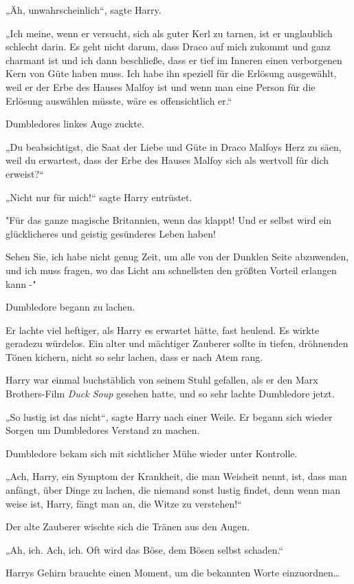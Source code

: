 {„Äh, unwahrscheinlich“, sagte Harry.

„Ich meine, wenn er versucht, sich als guter Kerl zu tarnen, ist er unglaublich schlecht darin. Es geht nicht darum, dass Draco auf mich zukommt und ganz charmant ist und ich dann beschließe, dass er tief im Inneren einen verborgenen Kern von Güte haben muss. Ich habe ihn speziell für die Erlösung ausgewählt, weil er der Erbe des Hauses Malfoy ist und wenn man eine Person für die Erlösung auswählen müsste, wäre es offensichtlich er.“

Dumbledores linkes Auge zuckte.

„Du beabsichtigst, die Saat der Liebe und Güte in Draco Malfoys Herz zu säen, weil du erwartest, dass der Erbe des Hauses Malfoy sich als wertvoll für dich erweist?“

„Nicht nur für mich!“ sagte Harry entrüstet.

"Für das ganze magische Britannien, wenn das klappt! Und er selbst wird ein glücklicheres und geistig gesünderes Leben haben!

Sehen Sie, ich habe nicht genug Zeit, um alle von der Dunklen Seite abzuwenden, und ich muss fragen, wo das Licht am schnellsten den größten Vorteil erlangen kann -"

Dumbledore begann zu lachen.

Er lachte viel heftiger, als Harry es erwartet hätte, fast heulend. Es wirkte geradezu würdelos. Ein alter und mächtiger Zauberer sollte in tiefen, dröhnenden Tönen kichern, nicht so sehr lachen, dass er nach Atem rang.

Harry war einmal buchstäblich von seinem Stuhl gefallen, als er den Marx Brothers-Film \emph{Duck Soup} gesehen hatte, und so sehr lachte Dumbledore jetzt.

„So lustig ist das nicht“, sagte Harry nach einer Weile. Er begann sich wieder Sorgen um Dumbledores Verstand zu machen.

Dumbledore bekam sich mit sichtlicher Mühe wieder unter Kontrolle.

„Ach, Harry, ein Symptom der Krankheit, die man Weisheit nennt, ist, dass man anfängt, über Dinge zu lachen, die niemand sonst lustig findet, denn wenn man weise ist, Harry, fängt man an, die Witze zu verstehen!“

Der alte Zauberer wischte sich die Tränen aus den Augen.

„Ah, ich. Ach, ich. Oft wird das Böse, dem Bösen selbst schaden.“

Harrys Gehirn brauchte einen Moment, um die bekannten Worte einzuordnen…

}
